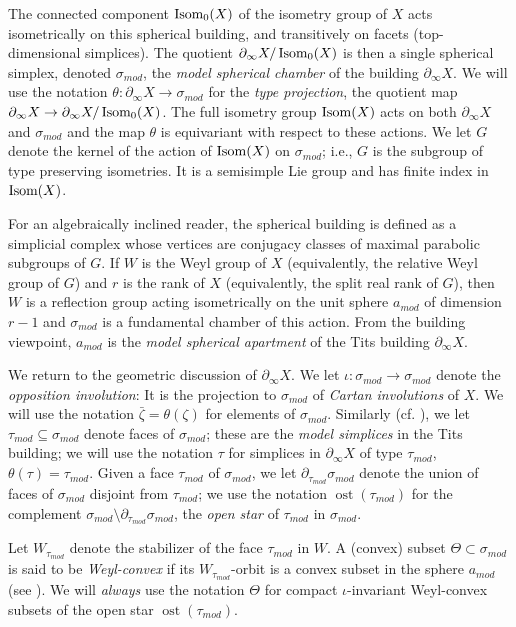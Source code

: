\documentclass[12pt]{article}
\theoremstyle{boldplain}
\theoremstyle{bolddefinition}
\numberwithin{equation}{section}
\def\si{\sigma}
\def\amod{a_{mod}}
\def\Dt{\partial_{\tau_{mod}}}
\def\geo{\partial_{\infty}}
\def\Isom{\mathop{\hbox{Isom}}}
\def\simod{\si_{mod}}
\def\ost{\operatorname{ost}}
\def\taumod{\tau_{mod}}
\begin{document}
The connected component $\Isom_0(X)$ of the isometry group of $X$ acts isometrically on this spherical building, and transitively on facets (top-dimensional simplices). The quotient 
$\geo X/\Isom_0(X)$ is then a single spherical simplex, denoted $\simod$, the {\em model spherical chamber} of the building $\geo X$. We will use the notation $\theta: \geo X\to \simod$ for the {\em type projection}, the quotient map $\geo X\to \geo X/\Isom_0(X)$. The full isometry group $\Isom(X)$ acts on both $\geo X$ and $\simod$ and the map $\theta$ is equivariant with respect to these actions. We let $G$ denote the kernel of the action of $\Isom(X)$ on $\simod$; 
i.e., $G$ is the subgroup of type preserving isometries.
It is a semisimple Lie group and has finite index in $\Isom(X)$. 


For an algebraically inclined reader, the spherical building is defined as a simplicial complex whose vertices are conjugacy classes  of maximal parabolic subgroups of $G$. If $W$ is the Weyl group of $X$ (equivalently, the relative Weyl group of $G$) and $r$ is the rank of $X$ (equivalently, the split real rank of $G$), then $W$ is a reflection group acting 
 isometrically on the unit sphere $\amod$ of dimension  $r-1$ and $\simod$ is a fundamental chamber of this action. From the building viewpoint, $\amod$ is the {\em model spherical apartment} of the Tits building $\geo X$. 
 
 We return to the geometric discussion of $\geo X$. We let $\iota: \simod\to\simod$ denote the {\em opposition involution}: It is the projection to $\simod$ of {\em Cartan involutions} of $X$. We will use the notation $\bar\zeta=\theta(\zeta)$ for elements of $\simod$. Similarly (cf. \cite[\S 2.2.2]{anolec}), we let $\taumod\subseteq\simod$ denote  faces of $\simod$; these are the {\em model simplices} in the Tits building; we will use the notation $\tau$ for simplices in $\geo X$ 
of type $\taumod$, $\theta(\tau)=\taumod$. Given a face $\taumod$ of $\simod$, we let $\Dt \simod$ denote the union of faces of $\simod$ disjoint from $\taumod$; we use the notation $\ost(\taumod)$ for the complement $\simod \setminus \Dt \simod$, the {\em open star} of $\taumod$ in $\simod$. 

Let $W_{\taumod}$ denote the stabilizer of the face $\taumod$ in $W$. A (convex) subset $\Theta\subset \simod$ is said to be {\em Weyl-convex} if its $W_{\taumod}$-orbit is a convex subset in the sphere $\amod$ (see \cite[Def. 2.7]{anolec}). We will {\em always} use the notation $\Theta$ for compact $\iota$-invariant Weyl-convex subsets of the open star $\ost(\taumod)$. 
\end{document}
